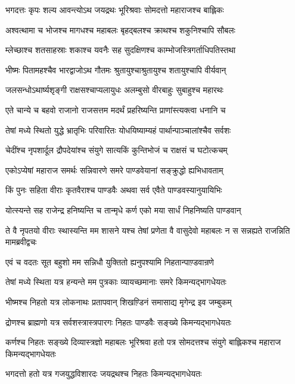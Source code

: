 \twolineshloka
{भगदत्तः कृपः शल्य आवन्त्योऽथ जयद्रथः}
{भूरिश्रवाः सोमदत्तो महाराजश्च बाह्लिकः}


\twolineshloka
{अश्वत्थामा च भोजश्च मागधश्च महाबलः}
{बृहद्बलश्च क्राथश्च शकुनिश्चापि सौबलः}


\twolineshloka
{म्लेच्छाश्च शतसाहस्राः शकाश्च यवनैः सह}
{सुदक्षिणश्च काम्भोजस्त्रिगर्ताधिपतिस्तथा}


\twolineshloka
{भीष्मः पितामहश्चैव भारद्वाजोऽथ गौतमः}
{श्रुतायुश्चाश्रुतायुश्च शतायुश्चापि वीर्यवान्}


\twolineshloka
{जलसन्धोऽथार्ष्यशृङ्गी राक्षसश्चाप्यलायुधः}
{अलम्बुसो वीरबाहुः सुबाहुश्च महारथः}


\twolineshloka
{एते चान्ये च बहवो राजानो राजसत्तम}
{मदर्थं प्रहरिष्यन्ति प्राणांस्त्यक्त्वा धनानि च}


\twolineshloka
{तेषां मध्ये स्थितो युद्धे भ्रातृभिः परिवारितः}
{योधयिष्याम्यहं पार्थान्पाञ्चालांश्चैव सर्वशः}


\twolineshloka
{चेदींश्च नृपशार्दूल द्रौपदेयांश्च संयुगे}
{सात्यकिं कुन्तिभोजं च राक्षसं च घटोत्कचम्}


\twolineshloka
{एकोऽप्येषां महाराज समर्थः सन्निवारणे}
{समरे पाण्डवेयानां सङ्क्रुद्धो ह्यभिधावताम्}


\twolineshloka
{किं पुनः सहिता वीराः कृतवैराश्च पाण्डवैः}
{अथवा सर्व एवैते पाण्डवस्यानुयायिभिः}


\twolineshloka
{योत्स्यन्ते सह राजेन्द्र हनिष्यन्ति च तान्मृधे}
{कर्ण एको मया सार्धं निहनिष्यति पाण्डवान्}


ते वै नृपतयो वीराः स्थास्यन्ति मम शासने
\twolineshloka
{यश्च तेषां प्रणेता वै वासुदेवो महाबलः}
{न स सन्नह्यते राजन्निति मामब्रवीद्वचः}


\twolineshloka
{एवं च वदतः सूत बहुशो मम सन्निधौ}
{युक्तितो ह्यनुपश्यामि निहतान्पाण़्डवान्रणे}


\twolineshloka
{तेषां मध्ये स्थिता यत्र हन्यन्ते मम पुत्रकाः}
{व्यायच्छमानाः समरे किमन्यद्भागधेयतः}


\twolineshloka
{भीष्मश्च निहतो यत्र लोकनाथः प्रतापवान्}
{शिखण़्डिनं समासाद्य मृगेन्द्र इव जम्बुकम्}


\twolineshloka
{द्रोणश्च ब्राह्मणो यत्र सर्वशस्त्रास्त्रपारगः}
{निहतः पाण्डवैः सङ्ख्ये किमन्यद्भागधेयतः}


\threelineshloka
{कर्णश्च निहतः सङ्ख्ये दिव्यास्त्रज्ञो महाबलः}
{भूरिश्रवा हतो पत्र सोमदत्तश्च संयुगे}
{बाह्लिकश्च महाराज किमन्यद्भागधेयतः}


\twolineshloka
{भगदत्तो हतो यत्र गजयुद्धविशारदः}
{जयद्रथश्च निहतः किमन्यद्भागधेयतः}


